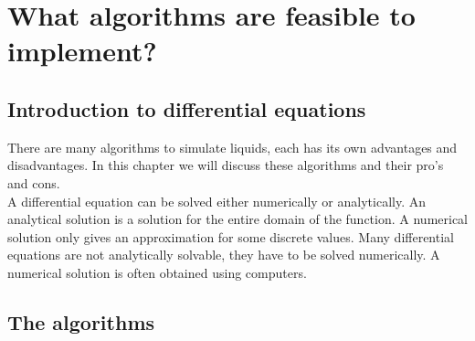 \documentclass{article}
\begin{document}
\newpage
\section{What algorithms are feasible to implement?}\label{What algorithms are feasible to implement?}
\subsection{Introduction to differential equations}
There are many algorithms to simulate liquids, each has its own advantages and disadvantages. In this chapter we will discuss these algorithms and their pro's and cons. 
\\
A differential equation can be solved either numerically or analytically. An analytical solution is a solution for the entire domain of the function. A numerical solution only gives an approximation for some discrete values.  Many differential equations are not analytically solvable, they have to be solved numerically. A numerical solution is often obtained using computers. \cite{What is discretization}




\subsection{The algorithms}
\end{document}
